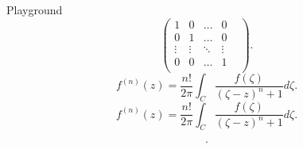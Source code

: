 \documentclass[class=article, crop=false]{standalone}
\begin{document}
\begin{zettel}{Playground}
\[
	\begin{pmatrix}
		1      & 0      & \dots  & 0        \\
		0      & 1      & \dots  & 0        \\
		\vdots & \vdots & \ddots & \vdots & \\
		0      & 0      & \dots  & 1        \\
	\end{pmatrix}
	.
\]
\[
	f ^{(n)}(z) =  \frac{n!}{2 \pi } \int_{C}^{} \frac{f (\zeta)}{(\zeta-z)^n+1 } d \zeta
	.
\]
\[
	f ^{(n)}(z) = \frac{n!}{2\pi} \int_{C}^{} \frac{f(\zeta)}{(\zeta - z)^n + 1} d \zeta
.\]


\[
.\]
\end{zettel}
\end{document}
